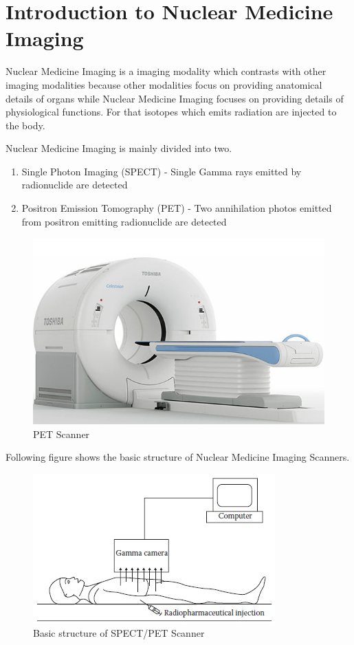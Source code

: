 \documentclass[12pt]{article}
\def \topic{Nuclear Medicine Imaging}
\begin{document}

\tableofcontents
\pagebreak


\section{Introduction to \topic}
Nuclear Medicine Imaging is a imaging modality which contrasts with other imaging modalities because other modalities focus on providing anatomical details of organs while Nuclear Medicine Imaging focuses on providing details of physiological functions. For that isotopes which emits radiation are injected to the body. 

Nuclear Medicine Imaging is mainly divided into two.
\begin{enumerate}
    \item Single Photon Imaging (SPECT) - Single Gamma rays emitted by radionuclide are detected
    \item Positron Emission Tomography (PET) - Two annihilation photos emitted from positron emitting radionuclide are detected
\end{enumerate}

\begin{figure}[h!]
  \centering
  \includegraphics[width=0.6\linewidth]{pet.jpg}
  \caption{\small{PET Scanner}}
  \label{fig:PET Scanner}
\end{figure}

Following figure shows the basic structure of Nuclear Medicine Imaging Scanners. 
\begin{figure}[h!]
  \centering
  \includegraphics[width=0.5\linewidth]{pet1.jpg}
  \caption{\small{Basic structure of SPECT/PET Scanner}}
  \label{fig:Basic structure of SPECT/PET Scanner}
\end{figure}
\end{document}
